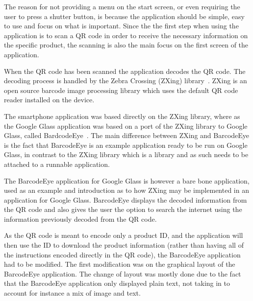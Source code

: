 The reason for not providing a menu on the start screen, or even requiring the user to press a shutter button, is because the application should be simple, easy to use and focus on what is important. Since the the first step when using the application is to scan a QR code in order to receive the necessary information on the specific product, the scanning is also the main focus on the first screen of the application.

When the QR code has been scanned the application decodes the QR code. The decoding process is handled by the Zebra Crossing (ZXing) library~\cite{zxing}. ZXing is an open source barcode image processing library which uses the default QR code reader installed on the device.

The smartphone application was based directly on the ZXing library, where as the Google Glass application was based on a port of the ZXing library to Google Glass, called BardcodeEye~\cite{barcodeEye}. The main difference between ZXing and BarcodeEye is the fact that BarcodeEye is an example application ready to be run on Google Glass, in contrast to the ZXing library which is a library and as such needs to be attached to a runnable application.

The BarcodeEye application for Google Glass is however a bare bone application, used as an example and introduction as to how ZXing may be implemented in an application for Google Glass. BarcodeEye displays the decoded information from the QR code and also gives the user the option to search the internet using the information previously decoded from the QR code.

As the QR code is meant to encode only a product ID, and the application will then use the ID to download the product information (rather than having all of the instructions encoded directly in the QR code), the BarcodeEye application had to be modified. The first modification was on the graphical layout of the BarcodeEye application. The change of layout was mostly done due to the fact that the BarcodeEye application only displayed plain text, not taking in to account for instance a mix of image and text.

